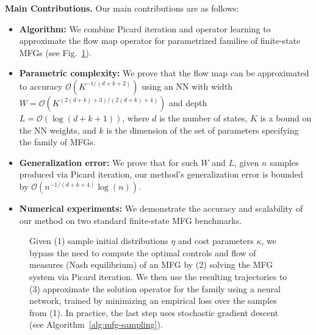 \documentclass[11pt,reqno]{amsart}
\numberwithin{equation}{section}
\theoremstyle{plain}
\newcommand{\1}{\boldsymbol{\mathbbm{1}}}
\begin{document}
\noindent\textbf{Main Contributions.} Our main contributions are as follows: 
\begin{itemize}
    \item \textbf{Algorithm:} We combine Picard iteration and operator learning to approximate the flow map operator for parametrized families of finite-state MFGs (see Fig.~\ref{fig:diagram}).
    \item \textbf{Parametric complexity:} We prove that the flow map can be approximated to accuracy $\mathcal{O}(K^{-1/(d+k+2)})$ using an NN with width $W = \mathcal{O}(K^{(2(d + k) + 3)/(2(d + k) + 4)})$ and depth $L = \mathcal{O}(\log(d + k + 1))$, where $d$ is the number of states, $K$ is a bound on the NN weights, and $k$ is the dimension of the set of parameters specifying the family of MFGs.
    \item \textbf{Generalization error:} We prove that for such $W$ and $L$, given $n$ samples produced via Picard iteration, our method's generalization error is bounded by $\mathcal{O}(n^{-1/(d + k + 4)}\log (n))$.
    \item \textbf{Numerical experiments:} We demonstrate the accuracy and scalability of our method on two standard finite-state MFG benchmarks.
\end{itemize}
\begin{figure}[h]
\centering
{}
\caption{Given (1) sample initial distributions $\eta$ and cost parameters $\kappa$, we bypass the need to compute the optimal controls and flow of measures (Nash equilibrium) of an MFG by (2) solving the MFG system via Picard iteration. We then use the resulting trajectories to (3) approximate the solution operator for the family using a neural network, trained by minimizing an empirical loss over the samples from (1). In practice, the last step uses stochastic gradient descent (see Algorithm~\ref{alg:mfg-sampling}).}
\label{fig:diagram}
\end{figure}
\end{document}
